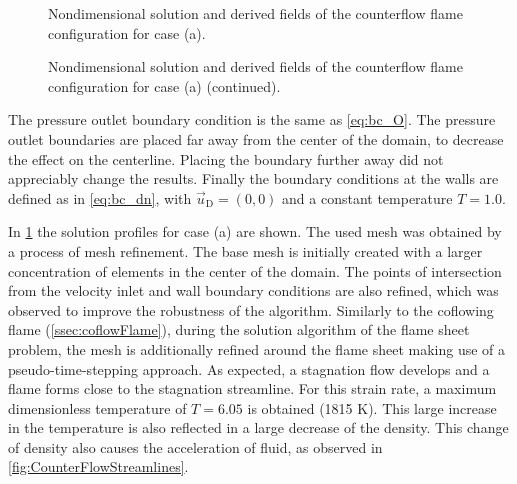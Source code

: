 \begin{figure}[p]
	\centering
	\pgfplotsset{width=0.73\textwidth, compat=1.3}
	\caption{Nondimensional solution and derived fields of the counterflow flame configuration for case (a).} \label{fig:CounterFlowFlameFig1}
\end{figure}
\begin{figure}[p]
	\ContinuedFloat
	\centering
	\pgfplotsset{width=0.73\textwidth, compat=1.3}		
	\caption{Nondimensional solution and derived fields of the counterflow flame configuration for case (a) (continued).}%
\end{figure} 


The pressure outlet boundary condition is the same as \cref{eq:bc_O}. The pressure outlet boundaries are placed far away from the center of the domain, to decrease the effect on the centerline. Placing the boundary further away did not appreciably change the results. Finally the boundary conditions at the walls are defined as in \cref{eq:bc_dn}, with $\vec{u}_{\text{D}} = (0,0)$ and a constant temperature $T = 1.0$.          
 
In \cref{fig:CounterFlowFlameFig1} the solution profiles for case (a) are shown. The used mesh was obtained by a process of mesh refinement. The base mesh is initially created with a larger concentration of elements in the center of the domain. The points of intersection from the velocity inlet and wall boundary conditions are also refined, which was observed to improve the robustness of the algorithm. Similarly to the coflowing flame (\cref{ssec:coflowFlame}), during the solution algorithm of the flame sheet problem, the mesh is additionally refined around the flame sheet making use of a pseudo-time-stepping approach.
As expected, a stagnation flow develops and a flame forms close to the stagnation streamline. For this strain rate, a maximum dimensionless temperature of $T = 6.05$ is obtained (1815 $\si{\kelvin}$). This large increase in the temperature is also reflected in a large decrease of the density. This change of density also causes the acceleration of fluid, as observed in \cref{fig:CounterFlowStreamlines}. 

